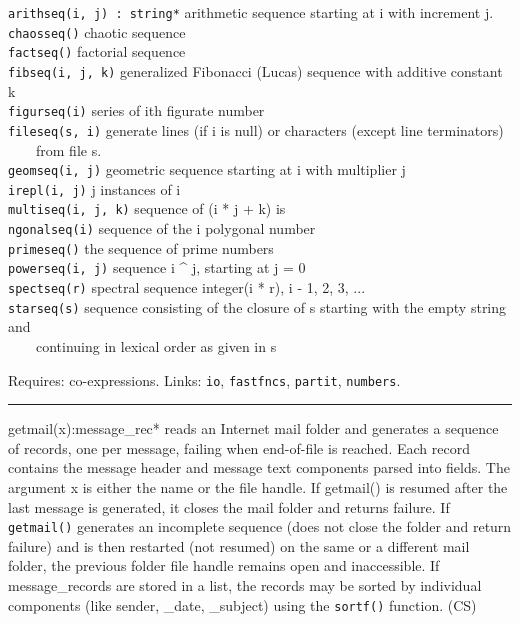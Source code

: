 \texttt{arithseq(i, j) : string*} arithmetic sequence starting at i with
increment j.\\
\texttt{chaosseq()} chaotic sequence\\
\texttt{factseq()} factorial sequence\\
\texttt{fibseq(i, j, k)} generalized Fibonacci (Lucas) sequence with
additive constant k\\
\texttt{figurseq(i)} series of i{\textquotesingle}th figurate
number\\
\texttt{fileseq(s, i)} generate lines (if i is null) or characters
(except line terminators)\\
 \ \ \ \ from file s.\\
\texttt{geomseq(i, j)} geometric sequence starting at i with multiplier
j\\
\texttt{irepl(i, j)} j instances of i\\
\texttt{multiseq(i, j, k)} sequence of (i * j + k)
i{\textquotesingle}s\\
\texttt{ngonalseq(i)} sequence of the i polygonal number\\
\texttt{primeseq()} the sequence of prime numbers\\
\texttt{powerseq(i, j)} sequence i \^{} j, starting at j = 0\\
\texttt{spectseq(r)} spectral sequence integer(i * r), i - 1, 2, 3,
...\\
\texttt{starseq(s)} sequence consisting of the closure of s starting
with the empty string and\\
 \ \ \ \ continuing in lexical order as given in s

Requires: co-expressions. Links: \texttt{io}, \texttt{fastfncs},
\texttt{partit}, \texttt{numbers}. 

\vspace{0.25cm}\hrule{}

\textsf{getmail(x):message\_rec*} reads an Internet mail folder and generates a sequence of records, one per message,
failing when end-of-file is reached. Each record contains the message
header and message text components parsed into fields. The argument x
is either the name or the file handle. If getmail() is resumed after
the last message is generated, it closes the mail folder and returns
failure. If \texttt{getmail()} generates an incomplete sequence (does
not close the folder and return failure) and is then restarted (not
resumed) on the same or a different mail folder, the previous folder
file handle remains open and inaccessible. If message\_records are
stored in a list, the records may be sorted by individual components
(like sender, \_date, \_subject) using the \texttt{sortf()} function.
(CS)

